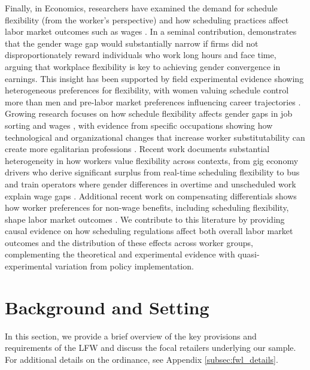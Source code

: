 \documentclass[letterpaper,11pt,leqno]{article}
\theoremstyle{paper}
\begin{document}
Finally, in Economics, researchers have examined the demand for schedule flexibility (from the worker's perspective) and how scheduling practices affect labor market outcomes such as wages \citep{Maestas2023ValueOfWorkingConditions,mas2017valuing,mas2020alternative,wiswall2018preference}. In a seminal contribution, \cite{goldin2014grand} demonstrates that the gender wage gap would substantially narrow if firms did not disproportionately reward individuals who work long hours and face time, arguing that workplace flexibility is key to achieving gender convergence in earnings. This insight has been supported by field experimental evidence showing heterogeneous preferences for flexibility, with women valuing schedule control more than men \citep{mas2017valuing} and pre-labor market preferences influencing career trajectories \citep{wiswall2018preference}. Growing research focuses on how schedule flexibility affects gender gaps in job sorting and wages \citep{goldin2011cost,goldin2021career,goldin2024parental}, with evidence from specific occupations showing how technological and organizational changes that increase worker substitutability can create more egalitarian professions \citep{goldin2016most}. Recent work documents substantial heterogeneity in how workers value flexibility across contexts, from gig economy drivers who derive significant surplus from real-time scheduling flexibility \citep{chen2019value} to bus and train operators where gender differences in overtime and unscheduled work explain wage gaps \citep{bolotnyy2022why}. Additional recent work on compensating differentials shows how worker preferences for non-wage benefits, including scheduling flexibility, shape labor market outcomes \citep{lamadon2022imperfect,lavetti2023compensating}. We contribute to this literature by providing causal evidence on how scheduling regulations affect both overall labor market outcomes and the distribution of these effects across worker groups, complementing the theoretical and experimental evidence with quasi-experimental variation from policy implementation.



\section{Background and Setting} \label{sec:background}

In this section, we provide a brief overview of the key provisions and requirements of the LFW and discuss the focal retailers underlying our sample. For additional details on the ordinance, see Appendix \ref{subsec:fwl_details}.
\end{document}
